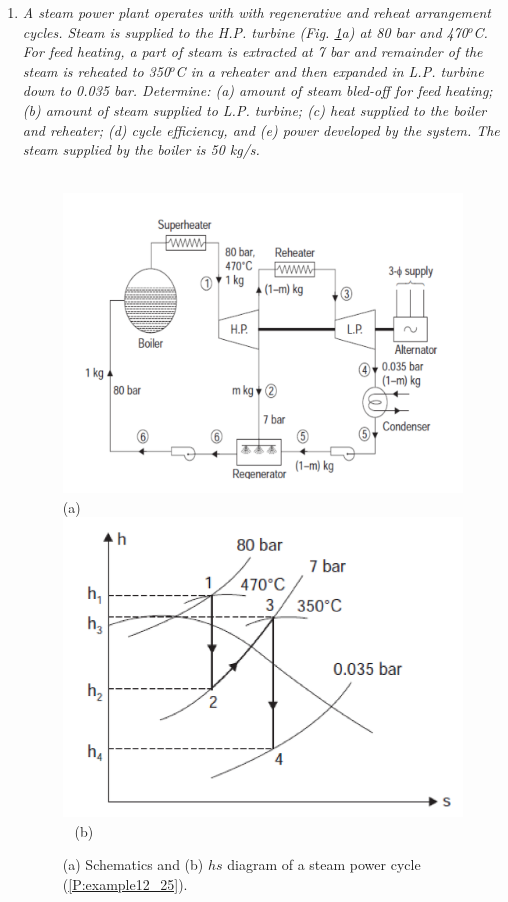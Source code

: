 \documentclass[12pts,a4paper,amsmath,amssymb,floatfix]{article}%
\begin{document}
\begin{enumerate}[label=\bfseries Problem \arabic*]
\item\label{P:example12_25} {\it A steam power plant operates with with regenerative and reheat arrangement cycles. Steam is supplied to the H.P. turbine (Fig. \ref{example12_25}a) at 80 bar and 470$^{o}$C.  For feed heating, a part of steam is extracted at 7 bar and remainder of the steam is reheated to 350$^{o}$C in a reheater and then expanded in L.P. turbine down to 0.035 bar. Determine: (a) amount of steam bled-off for feed heating; (b) amount of steam supplied to L.P. turbine; (c) heat supplied to the boiler and reheater; (d) cycle efficiency, and (e) power developed by the system. The steam supplied by the boiler is 50 kg/s.}
   \begin{figure}[h]
    \begin{center}
    \vbox{
     \hbox{\hspace{1cm}
      \includegraphics[width=12.cm,clip]{./../../ThermalEngines/Pics/Exemple12_25a_Rajput}}
     \hbox{\hspace{7.5cm}(a)}
     \hbox{\hspace{1.cm}
      \includegraphics[width=12.cm,clip]{./../../ThermalEngines/Pics/Exemple12_25b_Rajput}
      }
     \hbox{\hspace{7.5cm}(b)}}
     \caption{ (a) Schematics and (b) $hs$ diagram of a steam power cycle (\ref{P:example12_25}).}
     \label{example12_25}
     \end{center}
   \end{figure}
 


\end{enumerate}
\end{document}
